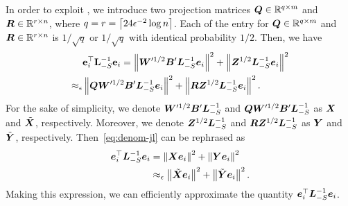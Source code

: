\documentclass[10pt,twocolumn,twoside]{IEEEtran}
\begin{document}
In order to exploit , we introduce two projection matrices \(\boldsymbol{Q}\in\mathbb{R}^{q\times m}\) and \(\boldsymbol{R}\in\mathbb{R}^{r\times n}\), where \(q=r=\left\lceil24\epsilon^{-2}\log n\right\rceil\). Each of the entry for \(\boldsymbol{Q}\in\mathbb{R}^{q\times m}\) and \(\boldsymbol{R}\in\mathbb{R}^{r\times n}\) is  $1/\sqrt{q}$ or $1/\sqrt{q}$ with identical probability $1/2$. Then, we have
\begin{equation}\label{eq:denom-jl}
    \begin{split}
        &\mathbf{e}_i^\top \mathbf{L}_{-S}^{-1}\mathbf{e}_i =\left\Vert\boldsymbol{W}'^{1/2}\boldsymbol{B}'\boldsymbol{L}_{-S}^{-1}\boldsymbol{e}_i\right\Vert^2+\left\Vert\boldsymbol{Z}^{1/2}\boldsymbol{L}_{-S}^{-1}\boldsymbol{e}_i\right\Vert^2\\
        \approx_\epsilon&\left\Vert\boldsymbol{Q}\boldsymbol{W}'^{1/2}\boldsymbol{B}'\boldsymbol{L}_{-S}^{-1}\boldsymbol{e}_i\right\Vert^2+\left\Vert\boldsymbol{R}\boldsymbol{Z}^{1/2}\boldsymbol{L}_{-S}^{-1}\boldsymbol{e}_i\right\Vert^2.
    \end{split}
\end{equation}
For the sake of simplicity, we denote \(\boldsymbol{W}'^{1/2}\boldsymbol{B}'\boldsymbol{L}_{-S}^{-1}\) and \(\boldsymbol{Q}\boldsymbol{W}'^{1/2}\boldsymbol{B}'\boldsymbol{L}_{-S}^{-1}\) as \(\boldsymbol{X}\) and \(\tilde{\boldsymbol{X}}\), respectively. Moreover, we  denote \(\boldsymbol{Z}^{1/2}\boldsymbol{L}_{-S}^{-1}\) and \(\boldsymbol{R}\boldsymbol{Z}^{1/2}\boldsymbol{L}_{-S}^{-1}\) as \(\boldsymbol{Y}\) and \(\tilde{\boldsymbol{Y}}\), respectively.
Then~\eqref{eq:denom-jl} can be rephrased as
\begin{equation}\label{eq:denom-solver-simp}
    \begin{split}
        \boldsymbol{e}_i^\top\boldsymbol{L}_{-S}^{-1}\boldsymbol{e}_i &=\left\Vert\boldsymbol{X}\boldsymbol{e}_i\right\Vert^2+\left\Vert\boldsymbol{Y}\boldsymbol{e}_i\right\Vert^2\\
        &\approx_\epsilon\left\Vert\tilde{\boldsymbol{X}}\boldsymbol{e}_i\right\Vert^2+\left\Vert\tilde{\boldsymbol{Y}}\boldsymbol{e}_i\right\Vert^2.
    \end{split}
\end{equation}
Making this expression,  we can efficiently approximate the quantity $\boldsymbol{e}_i^\top\boldsymbol{L}_{-S}^{-1}\boldsymbol{e}_i$.
\end{document}
